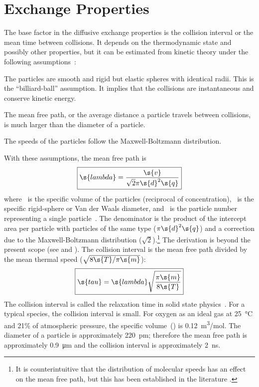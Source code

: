 \section{Exchange Properties}
\label{sec:ExchangeProperties}

The base factor in the diffusive exchange properties is the collision interval or the mean time between collisions.  It depends on the thermodynamic state and possibly other properties, but it can be estimated from kinetic theory under the following assumptions~\cite{Present1958}:
\begin{enumerate*}
  \item The particles are smooth and rigid but elastic spheres with identical radii.  This is the ``billiard-ball'' assumption.  It implies that the collisions are instantaneous and conserve kinetic energy.
  \item The mean free path, or the average distance a particle travels between collisions, is much larger than the diameter of a particle.
  \item The speeds of the particles follow the Maxwell-Boltzmann distribution.
\end{enumerate*}

With these assumptions, the mean free path is
\begin{equation}
  \label{eq:MeanFreePath}
  \boxed{\s{lambda} = \frac{\s{v}}{\sqrt{2}\pi\s{d}^2\s{q}}}
\end{equation}
where ~is the specific volume of the particles (reciprocal of concentration), ~is the specific rigid-sphere or Van der Waals diameter, and ~is the particle number representing a single particle~\cite{Present1958, Cercignani1962}. %
The denominator is the product of the intercept area per particle with particles of the same type ($\pi\s{d}^2\s{q}$) and a correction due to the Maxwell-Boltzmann distribution ($\sqrt{2}$).\footnote{It is counterintuitive that the distribution of molecular speeds has an effect on the mean free path, but this has been established in the literature \cite[p.~32]{Present1958}.}  The derivation is beyond the present scope (see \cite[pp.~31--32]{Present1958} and \cite[p.~229]{Cercignani1962}).  The collision interval is the mean free path divided by the mean thermal speed ($\sqrt{8\s{T}/\pi\s{m}}$):
\begin{equation}
  \label{eq:CollisionInterval}
  \boxed{\s{tau} = \s{lambda}\sqrt{\frac{\pi\s{m}}{8\s{T}}}}
\end{equation}
The collision interval is called the relaxation time in solid state physics~\cite{Ashcroft1976}.  For a typical species, the collision interval is small.  For oxygen as an ideal gas at \SI{25}{\celsius} and 21\% of atmospheric pressure, the specific volume~() is \SI{0.12}{m^3/mol}.  The diameter of a particle is approximately \SI{220}{pm}; therefore the mean free path is approximately \SI{0.9}{\micro\metre} and the collision interval is approximately \SI{2}{ns}.

